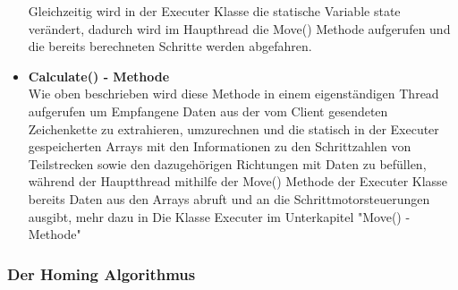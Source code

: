 \begin{itemize}
Gleichzeitig wird in der Executer Klasse die statische Variable state verändert, dadurch wird im Haupthread die Move() Methode aufgerufen und die bereits berechneten Schritte werden abgefahren.

\item \textbf{Calculate() - Methode}\\
Wie oben beschrieben wird diese Methode in einem eigenständigen Thread aufgerufen um Empfangene Daten aus der vom Client gesendeten Zeichenkette zu extrahieren, umzurechnen und die statisch in der Executer gespeicherten Arrays mit den Informationen zu den Schrittzahlen von Teilstrecken sowie den dazugehörigen Richtungen mit Daten zu befüllen, während der Hauptthread mithilfe der Move() Methode der Executer Klasse bereits Daten aus den Arrays abruft und an die Schrittmotorsteuerungen ausgibt, mehr dazu in Die Klasse Executer im Unterkapitel "Move() - Methode"
\end{itemize}
\subsubsection{Der Homing Algorithmus}
